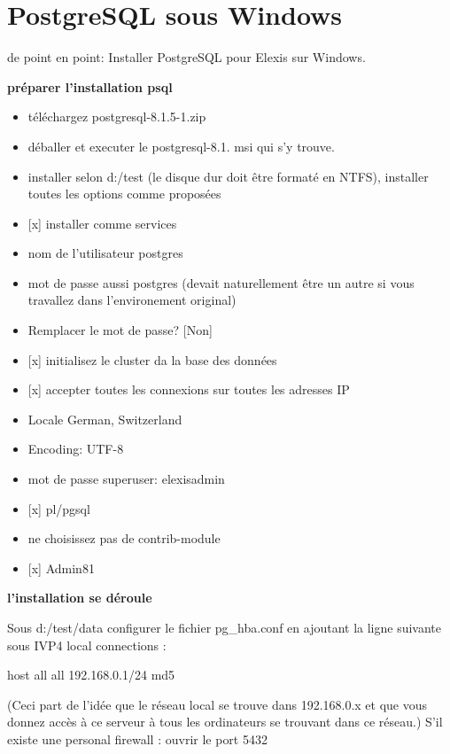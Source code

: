 \section{PostgreSQL sous Windows}
de point en point: Installer PostgreSQL pour Elexis sur Windows.


\textbf{préparer l'installation psql}

\begin{itemize}
\item téléchargez postgresql-8.1.5-1.zip
\item déballer et executer le postgresql-8.1. msi qui s'y trouve.
\item installer selon d:{/}test (le disque dur doit être formaté en NTFS), installer toutes les options comme proposées
\item  {[x]} installer comme services
\item  nom de l'utilisateur postgres
\item  mot de passe aussi postgres (devait naturellement être un autre si vous travallez dans l'environement original)
\item  Remplacer le mot de passe? {[}Non{]}
\item  {[x]} initialisez le cluster da la base des données
\item  {[x]} accepter toutes les connexions sur toutes les adresses IP
\item  Locale German, Switzerland
\item  Encoding: UTF-8
\item  mot de passe superuser: elexisadmin
\item  {[x]} pl/pgsql
\item  ne choisissez pas de contrib-module
\item  {[x]} Admin81
\end{itemize}

\textbf{l'installation se déroule}

Sous d:/test/data configurer le fichier pg\_hba.conf en
ajoutant  la ligne suivante sous IVP4 local connections :


host all all 192.168.0.1/24 md5


(Ceci part de l'idée que le réseau local se trouve dans 192.168.0.x et que vous donnez accès à ce serveur à tous les ordinateurs se trouvant dans ce réseau.) 
S'il existe une personal firewall : ouvrir le port 5432



